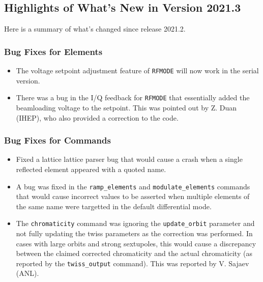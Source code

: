 \documentclass[11pt]{article}
\begin{document}
\subsection{Highlights of What's New in Version 2021.3}

Here is a summary of what's changed since release 2021.2. 

\subsubsection{Bug Fixes for Elements}

\begin{itemize}
\item The voltage setpoint adjustment feature of \verb|RFMODE| will now work in the serial version.
\item There was a bug in the I/Q feedback for \verb|RFMODE| that essentially added the beamloading
  voltage to the setpoint. This was pointed out by Z. Duan (IHEP), who also provided a correction
  to the code.
\end{itemize}

\subsubsection{Bug Fixes for Commands}
\begin{itemize}
\item Fixed a lattice lattice parser bug that would cause a crash when a single reflected element appeared with a quoted  name.
\item A bug was fixed in the \verb|ramp_elements| and \verb|modulate_elements| commands that would cause
  incorrect values to be asserted when multiple elements of the same name were targetted in the
  default differential mode.
\item The \verb|chromaticity| command was ignoring the \verb|update_orbit| parameter and not fully updating the
  twiss parameters as the correction was performed. In cases with large orbits and strong sextupoles, this would
  cause a discrepancy between the claimed corrected chromaticity and the actual chromaticity (as reported by the
  \verb|twiss_output| command). This was reported by V. Sajaev (ANL).
\end{itemize}
\end{document}
